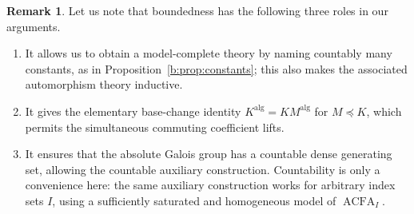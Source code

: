 \documentclass[10pt,a4paper]{amsart}
\theoremstyle{definition}
\newtheorem{remark}[theorem]{Remark}
\newcommand{\alg}{\mathrm{alg}}
\begin{document}
\begin{remark}
Let us note that boundedness has the following three roles in our arguments.
\begin{enumerate}
  \item It allows
us to obtain a model-complete theory by naming countably many
constants, as in Proposition~\ref{b:prop:constants}; this also makes
the associated automorphism theory inductive.

  \item It gives
the elementary base-change identity $K^{\alg}=KM^{\alg}$ for
$M\preccurlyeq K$, which permits the simultaneous commuting
coefficient lifts.

  \item It ensures that the absolute Galois
group has a countable dense generating set, allowing the
countable auxiliary construction. Countability is only a convenience here: the same auxiliary
construction works for arbitrary index sets $I$, using a sufficiently
saturated and homogeneous model of $\operatorname{ACFA}_I$.
\end{enumerate}
\end{remark}
\end{document}

